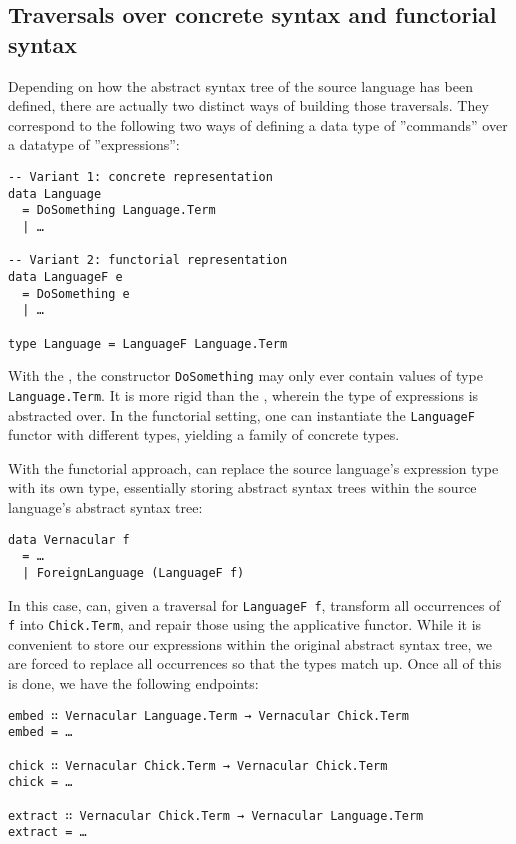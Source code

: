 \subsection{Traversals over concrete syntax and functorial syntax}

Depending on how the abstract syntax tree of the source language has been
defined, there are actually two distinct ways of building those traversals.
They correspond to the following two ways of defining a data type of
''commands'' over a datatype of ''expressions'':

\begin{verbatim}
-- Variant 1: concrete representation
data Language
  = DoSomething Language.Term
  | …

-- Variant 2: functorial representation
data LanguageF e
  = DoSomething e
  | …

type Language = LanguageF Language.Term
\end{verbatim}

With the , the constructor
\texttt{DoSomething} may only ever contain values of type
\texttt{Language.Term}.  It is more rigid than the
, wherein the type of expressions is
abstracted over.  In the functorial setting, one can instantiate the
\texttt{LanguageF} functor with different types, yielding a family
of concrete types.

With the functorial approach, \Coop{} can replace the source language's
expression type with its own type, essentially storing \Chick{} abstract syntax
trees within the source language's abstract syntax tree:

\begin{verbatim}
data Vernacular f
  = …
  | ForeignLanguage (LanguageF f)
\end{verbatim}

In this case, \Chick{} can, given a traversal for \texttt{LanguageF
f}, transform all occurrences of \texttt{f} into
\texttt{Chick.Term}, and repair those using the applicative
functor.  While it is convenient to store our expressions within the original
abstract syntax tree, we are forced to replace all occurrences so that the types
match up.  Once all of this is done, we have the following endpoints:

\begin{verbatim}
embed ∷ Vernacular Language.Term → Vernacular Chick.Term
embed = …

chick ∷ Vernacular Chick.Term → Vernacular Chick.Term
chick = …

extract ∷ Vernacular Chick.Term → Vernacular Language.Term
extract = …
\end{verbatim}

